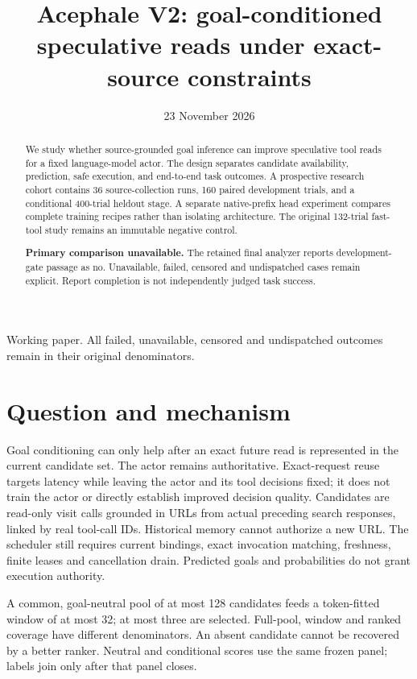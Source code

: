 \documentclass[10pt]{article}
\title{Acephale V2: goal-conditioned speculative reads under exact-source constraints}
\author{}
\date{23 November 2026}
\begin{document}
\maketitle
\begin{center}\small Working paper. All failed, unavailable, censored and undispatched outcomes remain in their original denominators.\end{center}
\begin{abstract}
We study whether source-grounded goal inference can improve speculative tool reads for a fixed language-model actor. The design separates candidate availability, prediction, safe execution, and end-to-end task outcomes. A prospective research cohort contains 36 source-collection runs, 160 paired development trials, and a conditional 400-trial heldout stage. A separate native-prefix head experiment compares complete training recipes rather than isolating architecture. The original 132-trial fast-tool study remains an immutable negative control.

\textbf{Primary comparison unavailable.} The retained final analyzer reports development-gate passage as no. Unavailable, failed, censored and undispatched cases remain explicit. Report completion is not independently judged task success.
\end{abstract}

\hypertarget{question-and-mechanism}{%
\section{Question and mechanism}\label{question-and-mechanism}}

Goal conditioning can only help after an exact future read is represented in the current candidate set. The actor remains authoritative. Exact-request reuse targets latency while leaving the actor and its tool decisions fixed; it does not train the actor or directly establish improved decision quality. Candidates are read-only visit calls grounded in URLs from actual preceding search responses, linked by real tool-call IDs. Historical memory cannot authorize a new URL. The scheduler still requires current bindings, exact invocation matching, freshness, finite leases and cancellation drain. Predicted goals and probabilities do not grant execution authority.

A common, goal-neutral pool of at most 128 candidates feeds a token-fitted window of at most 32; at most three are selected. Full-pool, window and ranked coverage have different denominators. An absent candidate cannot be recovered by a better ranker. Neutral and conditional scores use the same frozen panel; labels join only after that panel closes.
\end{document}
